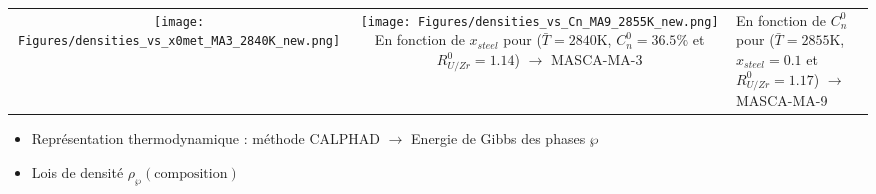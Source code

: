 \begin{frame}
\begin{columns}[T]
  \begin{column}{0.6\textwidth} 
\renewcommand{\arraystretch}{0.1}
\begin{tabularx}{\textwidth}{>{\setlength{\baselineskip}{0.5\baselineskip}}C >{\setlength{\baselineskip}{0.5\baselineskip}}C}
\texttt{[image: Figures/densities\_vs\_x0met\_MA3\_2840K\_new.png]} & \texttt{[image: Figures/densities\_vs\_Cn\_MA9\_2855K\_new.png]} \n
{\tiny En fonction de $x_{steel}$ pour ($\bar{T}=2840$K, $C_n^0=36.5\%$ et $R_{U/Zr}^0=1.14$) $\rightarrow$ MASCA-MA-3} & {\tiny En fonction de $C_n^0$ pour ($\bar{T}=2855$K, $x_{steel}=0.1$ et $R_{U/Zr}^0=1.17$) $\rightarrow$ MASCA-MA-9}
\end{tabularx}
\renewcommand{\arraystretch}{1.0}
      \baselineskip
\begin{itemize}
\item Représentation thermodynamique : méthode CALPHAD $\rightarrow$ Energie de Gibbs des phases $\wp$
\item Lois de densité $\rho_{\wp}\left(\text{composition}\right)$
\end{itemize}
  \end{column}
\end{columns}
\end{frame}
